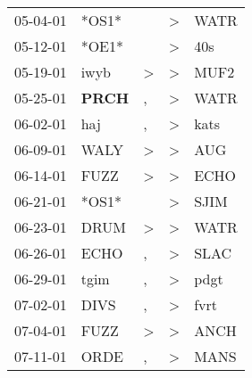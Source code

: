 \begin{supertabular}{p{0.07\textwidth}p{0.06\textwidth}p{0.02\textwidth}p{0.02\textwidth}p{0.06\textwidth}}
          05-04-01\textsuperscript{} &                            *OS1* &                  &     \textgreater &           WATR\textsuperscript{} \\
          05-12-01\textsuperscript{} &                            *OE1* &                  &     \textgreater &            40s\textsuperscript{} \\
          05-19-01\textsuperscript{} &           iwyb\textsuperscript{} &     \textgreater &     \textgreater &           MUF2\textsuperscript{} \\
          05-25-01\textsuperscript{} &  \textbf{PRCH\textsuperscript{}} &                , &     \textgreater &           WATR\textsuperscript{} \\
          06-02-01\textsuperscript{} &            haj\textsuperscript{} &                , &     \textgreater &           kats\textsuperscript{} \\
          06-09-01\textsuperscript{} &           WALY\textsuperscript{} &     \textgreater &     \textgreater &            AUG\textsuperscript{} \\
          06-14-01\textsuperscript{} &           FUZZ\textsuperscript{} &     \textgreater &     \textgreater &           ECHO\textsuperscript{} \\
          06-21-01\textsuperscript{} &                            *OS1* &                  &     \textgreater &           SJIM\textsuperscript{} \\
          06-23-01\textsuperscript{} &           DRUM\textsuperscript{} &     \textgreater &     \textgreater &           WATR\textsuperscript{} \\
          06-26-01\textsuperscript{} &           ECHO\textsuperscript{} &                , &     \textgreater &           SLAC\textsuperscript{} \\
          06-29-01\textsuperscript{} &           tgim\textsuperscript{} &                , &     \textgreater &           pdgt\textsuperscript{} \\
          07-02-01\textsuperscript{} &           DIVS\textsuperscript{} &                , &     \textgreater &           fvrt\textsuperscript{} \\
          07-04-01\textsuperscript{} &           FUZZ\textsuperscript{} &     \textgreater &     \textgreater &           ANCH\textsuperscript{} \\
          07-11-01\textsuperscript{} &           ORDE\textsuperscript{} &                , &     \textgreater &           MANS\textsuperscript{} \\

\end{supertabular}
